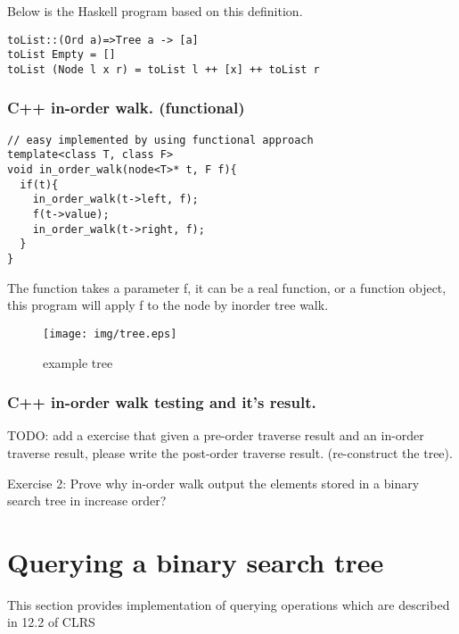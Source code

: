 \documentclass{article}
\begin{document}
Below is the Haskell program based on this definition.

\lstset{language=Haskell}
\begin{lstlisting}
toList::(Ord a)=>Tree a -> [a]
toList Empty = []
toList (Node l x r) = toList l ++ [x] ++ toList r
\end{lstlisting}

\subsubsection*{C++ in-order walk. (functional)}
\lstset{language=C++}
\begin{lstlisting}
// easy implemented by using functional approach
template<class T, class F>
void in_order_walk(node<T>* t, F f){
  if(t){
    in_order_walk(t->left, f);
    f(t->value);
    in_order_walk(t->right, f);
  }
}
\end{lstlisting}
The function takes a parameter f, it can be a real function, or a function
object, this program will apply f to the node by inorder tree walk.

\begin{figure}[htbp]
       \begin{center}
	\texttt{[image: img/tree.eps]}
        \caption{example tree} \label{fig:example-tree}
       \end{center}
\end{figure}

\subsubsection*{C++ in-order walk testing and it's result.}

TODO: add a exercise that given a pre-order traverse result and an in-order
traverse result, please write the post-order traverse result. (re-construct
the tree).

Exercise 2: Prove why in-order walk output the elements stored in a binary
search tree in increase order?


\section{Querying a binary search tree}

This section provides implementation of querying operations which are
described in 12.2 of CLRS\cite{CLRS}
\end{document}
